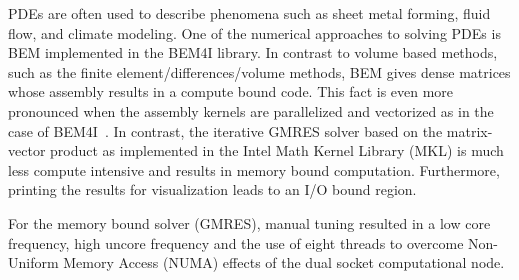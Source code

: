 PDEs are often used to describe phenomena such as sheet metal forming, fluid flow, and climate modeling. One of the numerical approaches to solving PDEs is BEM implemented in the BEM4I library. In contrast to volume based methods, such as the finite element/differences/volume methods, BEM gives dense matrices whose assembly results in a compute bound code. This fact is even more pronounced when the assembly kernels are parallelized and vectorized as in the case of BEM4I~\cite{ch6_ZapMerMal2016,ch6_MerZapJar2016}. In contrast, the iterative GMRES solver based on the matrix-vector product as implemented in the Intel Math Kernel Library (MKL) is much less compute intensive and results in memory bound computation. Furthermore, printing the results for visualization leads to an I/O bound region. 

For the memory bound solver (GMRES), manual tuning resulted in a low core frequency, high uncore frequency and the use of eight threads to overcome Non-Uniform Memory Access (NUMA) effects of the dual socket computational node. 


